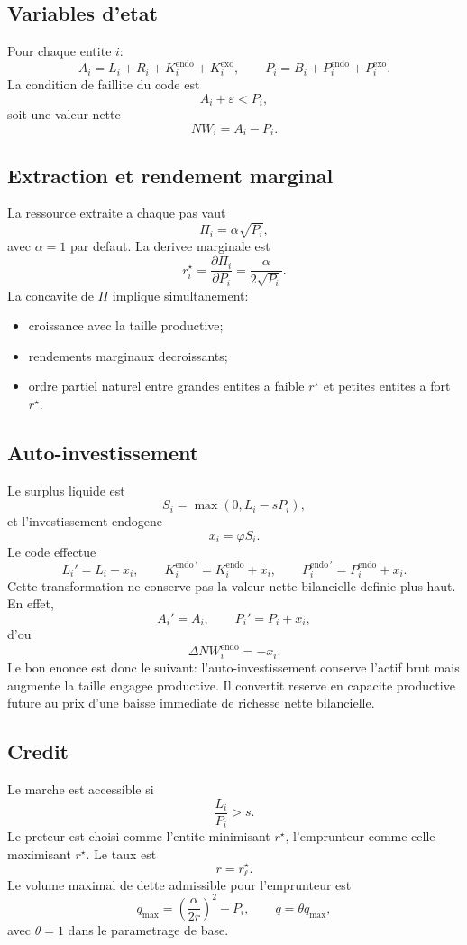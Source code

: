 \documentclass[11pt,a4paper]{article}
\begin{document}
\subsection{Variables d'etat}
Pour chaque entite $i$:
\[
A_i = L_i + R_i + K_i^{\mathrm{endo}} + K_i^{\mathrm{exo}},
\qquad
P_i = B_i + P_i^{\mathrm{endo}} + P_i^{\mathrm{exo}}.
\]
La condition de faillite du code est
\[
A_i + \varepsilon < P_i,
\]
soit une valeur nette
\[
NW_i = A_i - P_i.
\]

\subsection{Extraction et rendement marginal}
La ressource extraite a chaque pas vaut
\[
\Pi_i = \alpha \sqrt{P_i},
\]
avec $\alpha=1$ par defaut. La derivee marginale est
\[
r_i^\star = \frac{\partial \Pi_i}{\partial P_i} = \frac{\alpha}{2\sqrt{P_i}}.
\]
La concavite de $\Pi$ implique simultanement:
\begin{itemize}
\item croissance avec la taille productive;
\item rendements marginaux decroissants;
\item ordre partiel naturel entre grandes entites a faible $r^\star$ et petites entites a fort $r^\star$.
\end{itemize}

\subsection{Auto-investissement}
Le surplus liquide est
\[
S_i = \max(0,L_i-sP_i),
\]
et l'investissement endogene
\[
x_i = \varphi S_i.
\]
Le code effectue
\[
L_i' = L_i-x_i,\qquad
K_i^{\mathrm{endo}\,'}=K_i^{\mathrm{endo}}+x_i,\qquad
P_i^{\mathrm{endo}\,'}=P_i^{\mathrm{endo}}+x_i.
\]
Cette transformation ne conserve pas la valeur nette bilancielle definie plus haut. En effet,
\[
A_i' = A_i,
\qquad
P_i' = P_i + x_i,
\]
d'ou
\[
\Delta NW_i^{\mathrm{endo}} = -x_i.
\]
Le bon enonce est donc le suivant: l'auto-investissement conserve l'actif brut mais augmente la taille engagee productive. Il convertit reserve en capacite productive future au prix d'une baisse immediate de richesse nette bilancielle.

\subsection{Credit}
Le marche est accessible si
\[
\frac{L_i}{P_i}>s.
\]
Le preteur est choisi comme l'entite minimisant $r^\star$, l'emprunteur comme celle maximisant $r^\star$. Le taux est
\[
r = r^\star_{\ell}.
\]
Le volume maximal de dette admissible pour l'emprunteur est
\[
q_{\max} = \left(\frac{\alpha}{2r}\right)^2 - P_i,
\qquad
q=\theta q_{\max},
\]
avec $\theta=1$ dans le parametrage de base.
\end{document}
